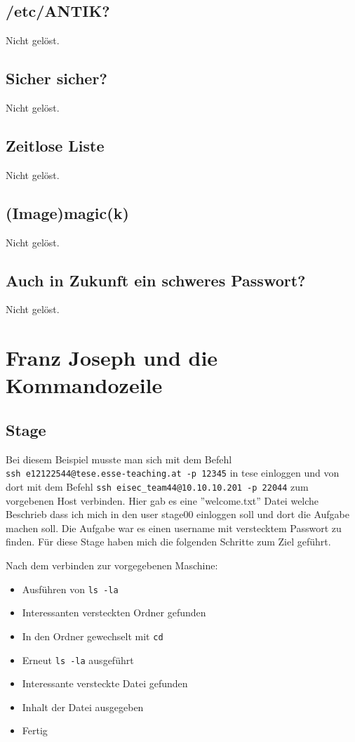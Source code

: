 \documentclass[12pt, a4paper, titlepage, oneside]{scrartcl}
\begin{document}
	\subsection{/etc/ANTIK?}
	Nicht gelöst.

	\subsection{Sicher sicher?}
	Nicht gelöst.

	\subsection{Zeitlose Liste}
	Nicht gelöst.

	\subsection{(Image)magic(k)}
	Nicht gelöst.

	\subsection{Auch in Zukunft ein schweres Passwort?}
	Nicht gelöst.

	\section{Franz Joseph und die Kommandozeile}

	\subsection{Stage}
	Bei diesem Beispiel musste man sich mit dem Befehl \\ \lstinline{ssh e12122544@tese.esse-teaching.at -p 12345}
	in tese einloggen und von dort mit dem Befehl \lstinline{ssh eisec_team44@10.10.10.201 -p 22044}
	zum vorgebenen Host verbinden. Hier gab es eine ''welcome.txt'' Datei welche
	Beschrieb dass ich mich in den user stage00 einloggen soll und dort die
	Aufgabe machen soll. Die Aufgabe war es einen username mit verstecktem Passwort
	zu finden. Für diese Stage haben mich die folgenden Schritte zum Ziel geführt.

	Nach dem verbinden zur vorgegebenen Maschine:
	\begin{itemize}
		\item Ausführen von \lstinline{ls -la}

		\item Interessanten versteckten Ordner gefunden

		\item In den Ordner gewechselt mit \lstinline{cd}

		\item Erneut \lstinline{ls -la} ausgeführt

		\item Interessante versteckte Datei gefunden

		\item Inhalt der Datei ausgegeben

		\item Fertig
	\end{itemize}
\end{document}

